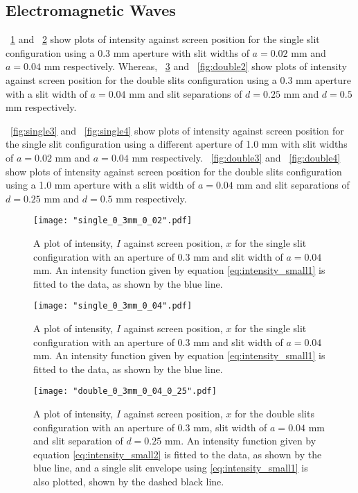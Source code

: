 \documentclass{article}
\newcommand{\figref}[2][\figurename~]{#1\ref{#2}}
\begin{document}
\subsection{Electromagnetic Waves}
\label{ssec:diffraction-results}

\figref{fig:single1} and \figref{fig:single2} show plots of intensity against screen position for the single slit configuration using a 0.3 mm aperture with slit widths of $a = 0.02$ mm and $a = 0.04$ mm respectively. Whereas, \figref{fig:double1} and \figref{fig:double2} show plots of intensity against screen position for the double slits configuration using a 0.3 mm aperture with a slit width of $a = 0.04$ mm and slit separations of $d = 0.25$ mm and $d = 0.5$ mm respectively.

\vspace{2mm}
\noindent
\figref{fig:single3} and \figref{fig:single4} show plots of intensity against screen position for the single slit configuration using a different aperture of 1.0 mm with slit widths of $a = 0.02$ mm and $a = 0.04$ mm respectively. \figref{fig:double3} and \figref{fig:double4} show plots of intensity against screen position for the double slits configuration using a 1.0 mm aperture with a slit width of $a = 0.04$ mm and slit separations of $d = 0.25$ mm and $d = 0.5$ mm respectively.

\vspace{40mm}
\noindent


\begin{figure}[h]
\centering
\texttt{[image: "single\_0\_3mm\_0\_02".pdf]}
\caption{A plot of intensity, $I$ against screen position, $x$ for the single slit configuration with an aperture of 0.3 mm and slit width of $ a = 0.04$ mm. An intensity function given by equation \eqref{eq:intensity_small1} is fitted to the data, as shown by the blue line.}
\label{fig:single1}
\end{figure}

\begin{figure}[h]
\centering
\texttt{[image: "single\_0\_3mm\_0\_04".pdf]}
\caption{A plot of intensity, $I$ against screen position, $x$ for the single slit configuration with an aperture of 0.3 mm and slit width of $a = 0.04$ mm. An intensity function given by equation \eqref{eq:intensity_small1} is fitted to the data, as shown by the blue line.}
\label{fig:single2}
\end{figure}

\begin{figure}[h]
\centering
\texttt{[image: "double\_0\_3mm\_0\_04\_0\_25".pdf]}
\caption{A plot of intensity, $I$ against screen position, $x$ for the double slits configuration with an aperture of 0.3 mm, slit width of $a = 0.04$ mm and slit separation of $d = 0.25$ mm. An intensity function given by equation \eqref{eq:intensity_small2} is fitted to the data, as shown by the blue line, and a single slit envelope using \eqref{eq:intensity_small1} is also plotted, shown by the dashed black line.}
\label{fig:double1}
\end{figure}
\end{document}
